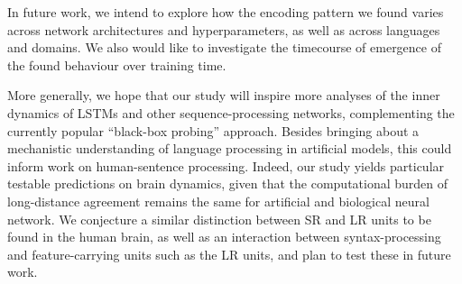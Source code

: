 In future work, we intend to explore how the encoding pattern we found varies across network architectures and hyperparameters, as well as across languages and domains. We also would like to investigate the timecourse of emergence of the found behaviour over training time.

More generally, we hope that our study will inspire more analyses of the inner dynamics of LSTMs and other sequence-processing networks, complementing the currently popular ``black-box probing'' approach. Besides bringing about a mechanistic understanding of language processing in artificial models, this could inform work on human-sentence processing. Indeed, our study yields particular testable predictions on brain dynamics, given that the computational burden of long-distance agreement remains the same for artificial and biological neural network. We conjecture a similar distinction between SR and LR units to be found in the human brain, as well as an interaction between syntax-processing and feature-carrying units such as the LR units, and plan to test these in future work.
